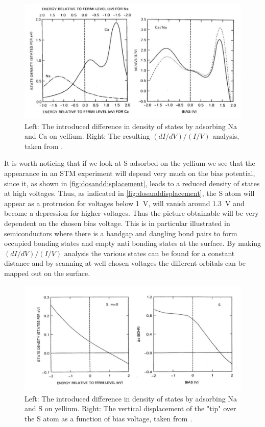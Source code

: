 \begin{figure}[h!]
	\begin{center}
	\includegraphics[scale=4.2]{figures/10_07.png}
	\caption{Left: The introduced difference in density of states by adsorbing Na and Ca on yellium. Right: The resulting $(dI/dV)/(I/V)$ analysis, taken from \cite{Lang}.}
	\label{fig:dos}
	\end{center}
\end{figure}

It is worth noticing that if we look at S adsorbed on the yellium we see that the appearance in an STM experiment will depend very much on the bias potential, since it, as shown in \autoref{fig:dosanddisplacement}, leads to a reduced density of states at high voltages. Thus, as indicated in \autoref{fig:dosanddisplacement}, the S atom will appear as a protrusion for voltages below \SI{1}{V}, will vanish around \SI{1.3}{V} and become a depression for higher voltages. Thus the picture obtainable will be very dependent on the chosen bias voltage. This is in particular illustrated in semiconductors where there is a bandgap and dangling bond pairs to form occupied bonding states and empty anti bonding states at the surface. By making $(dI/dV)/(I/V)$ analysis the various states can be found for a constant distance and by scanning  at well chosen voltages the different orbitals can be mapped out on the surface.

\begin{figure}[h!]
	\begin{center}
	\includegraphics[scale=4.2]{figures/10_08.png}
	\caption{Left: The introduced difference in density of states by adsorbing Na and S on yellium. Right: The vertical displacement of the "tip" over the S atom as a function of bias voltage, taken from \cite{Lang}.}
	\label{fig:dosanddisplacement}
	\end{center}
\end{figure}

